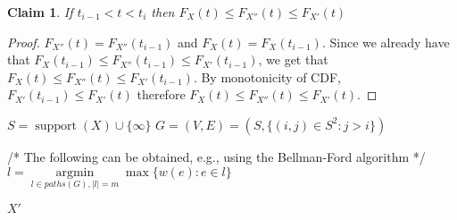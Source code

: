 \documentclass[review]{elsarticle}
\newtheorem{claim}{Claim}
\DeclareMathOperator{\support}{support}
\begin{document}
\begin{claim}\label{suppGMin}
If $t_{i-1} < t < t_i$ then $F_{X}(t) \leq F_{X''}(t) \leq F_{X'}(t)$
\end{claim}
\begin{proof}
$F_{X''}(t)= F_{X''}(t_{i-1})$ and $F_{X}(t)=F_{X}(t_{i-1})$. Since we already have that $F_{X}(t_{i-1}) \leq F_{X''}(t_{i-1}) \leq F_{X'}(t_{i-1})$, we get that $F_{X}(t) \leq F_{X''}(t) \leq F_{X'}(t_{i-1})$. By monotonicity of CDF, $F_{X'}(t_{i-1}) \leq F_{X'}(t)$ therefore $F_{X}(t) \leq F_{X''}(t) \leq F_{X'}(t)$.
\end{proof}


%
%  
%     


\begin{algorithm}
	\DontPrintSemicolon
	$S = \support(X)\cup \{\infty\}$\;
	$G=(V,E)=(S, \{ (i,j) \in S^2 \colon  j>i \})$ \;
	

	/* The following can be obtained, e.g., using the Bellman-Ford algorithm */\;
	$l= \operatorname{argmin}\limits_{l \in paths(G),|l|=m}  \max \{ w(e)\colon e \in l  \}$ \;
	

	\Return $X'$\;
	
	\caption{$OptTrim (X, m)$}  
	\label{alg:sequence}
\end{algorithm}
\end{document}
